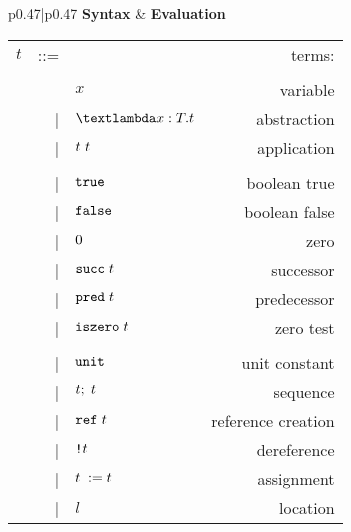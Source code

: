\begin{figure}[h]
\footnotesize
\begin{tabular}{p{}|p{}}
    \textbf{Syntax} & \textbf{Evaluation} \\[1em]
    \begin{tabular}{r@{\hspace{0.5em}}r@{\hspace{0.5em}}l@{\hspace{0.5em}}r}
        $t$ & ::= &                             & terms:              \\
            &     &                             &                     \\
            &     & $x$                         & variable            \\
            & |   & $\tyabs{x}{T}{t}$           & abstraction         \\
            & |   & $t\ t$                & application         \\
            &     &                             &                     \\
            & |   & $\texttt{true}$                     & boolean true        \\
            & |   & $\texttt{false}$                    & boolean false       \\
            & |   & $0$                     & zero                \\
            & |   & $\texttt{succ\;}t$                 & successor           \\
            & |   & $\texttt{pred\;}t$                 & predecessor         \\
            & |   & $\texttt{iszero\;}t$               & zero test           \\
            &     &                             &                     \\
            & |   & $\texttt{unit}$                     & unit constant       \\
            & |   & $t;\;t$                & sequence            \\
            & |   & $\texttt{ref\;}t$                  & reference creation  \\
            & |   & $\texttt{!}t$                 & dereference         \\
            & |   & $t\;:= t$             & assignment          \\
            & |   & $l$                         & location            \\

\end{tabular}
\end{tabular}
\end{figure}
